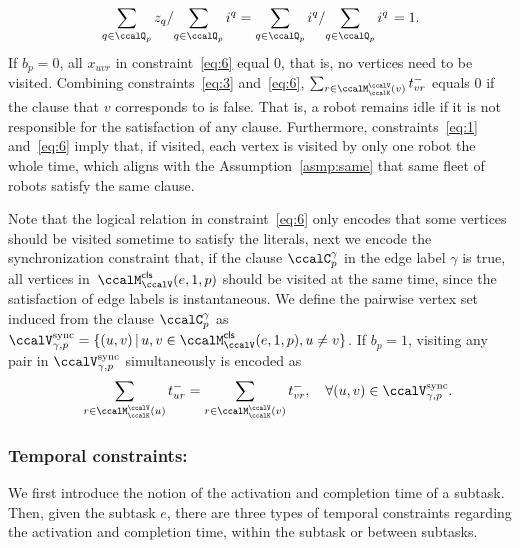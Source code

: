 \documentclass[Afour,sageh,times]{sagej}
\newtheorem{defn}[thm]{Definition}
\begin{document}
{{{{  \begin{align*}
   \left. \sum_{q\in \ccalQ_p} z_q \small/ {\sum_{q\in \ccalQ_p} i^q} = {\sum_{q\in \ccalQ_p} i^q} \small/{\sum_{q\in \ccalQ_p} i^q} \right. = 1.
  \end{align*}
If $b_p=0$, all $x_{uvr}$ in constraint~\eqref{eq:6} equal 0, that is, no vertices need to be visited. Combining constraints~\eqref{eq:3} and~\eqref{eq:6}, $\sum_{r\in \ccalM^\ccalV_{\ccalK}(v)} t^-_{vr}$ equals 0 if the  clause that $v$ corresponds to is false. That is, a robot remains idle if it is not responsible for the satisfaction of any clause. Furthermore, constraints~\eqref{eq:1} and~\eqref{eq:6} imply that, if visited, each vertex is visited by only one robot the whole time, which aligns with the Assumption~\ref{asmp:same} that same fleet of robots satisfy the same clause.

    Note that the logical relation in constraint~\eqref{eq:6} only encodes that some vertices should be visited sometime to satisfy the literals, next we encode the synchronization constraint that, if the clause $\ccalC_p^\gamma$ in the edge label $\gamma$ is true, all vertices in~$\ccalM^\mathsf{cls}_\ccalV(e, 1,p)$ should be visited at the same time, since the satisfaction of edge labels is instantaneous.
      We define the pairwise vertex set induced from the clause $\ccalC_p^\gamma$ as  $\ccalV_{\gamma, p}^{\text{sync}} = \{(u,v)\,|\, u, v\in \ccalM^\mathsf{cls}_\ccalV(e,1,p), u\not= v \}$. If $b_p=1$, visiting any pair in $\ccalV_{\gamma, p}^{\text{sync}}$ simultaneously is encoded as
\begingroup\makeatletter\def\f@size{10}\check@mathfonts
\def\maketag@@@#1{\hbox{\m@th\normalsize\normalfont#1}}%
\begin{align}
  & \quad\quad  \sum_{r\in \ccalM^\ccalV_{\ccalK}(u)} t_{ur}^-  = \sum_{r\in \ccalM^\ccalV_{\ccalK}(v)} t_{vr}^- , \quad\forall (u,v) \in \ccalV_{\gamma, p}^{\text{sync}}.\label{eq:7}
\end{align}
\endgroup





\subsubsection{Temporal constraints:}\label{sec:temporal} We first introduce the notion of the activation and completion time of a subtask. Then, given the subtask $e$, there are three types of temporal constraints regarding the activation and completion time,  within the subtask or between subtasks.
}}}}
\end{document}
